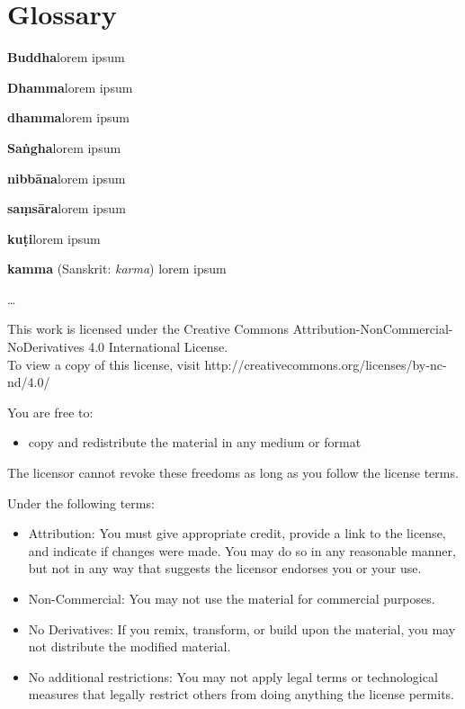 \chapter*{Glossary}
\parindent 0pt
\parskip 4pt

\textbf{Buddha}\hspace{9pt}lorem ipsum

\textbf{Dhamma}\hspace{9pt}lorem ipsum

\textbf{dhamma}\hspace{9pt}lorem ipsum

\textbf{Saṅgha}\hspace{9pt}lorem ipsum

\textbf{nibbāna}\hspace{9pt}lorem ipsum

\textbf{saṃsāra}\hspace{9pt}lorem ipsum

\textbf{kuṭi}\hspace{9pt}lorem ipsum

\textbf{kamma}\hspace{9pt} (Sanskrit: \emph{karma}) lorem ipsum

\ldots{}

\clearpage
\mbox{}
\clearpage
\footnotesize
\begin{center}
This work is licensed under the Creative Commons
Attribution-NonCommercial-NoDerivatives 4.0 International License.\\To
view a copy of this license, visit
http://creativecommons.org/licenses/by-nc-nd/4.0/
\end{center}

You are free to:

\begin{itemize}
\item copy and redistribute the material in any medium or format 
\end{itemize}


The licensor cannot revoke these freedoms as long as you follow the
license terms.

Under the following terms:

\begin{itemize}
\item Attribution: You must give appropriate credit, provide a link to 
the
license, and indicate if changes were made. You may do so in any
reasonable manner, but not in any way that suggests the licensor
endorses you or your use. 

\item Non-Commercial: You may not use the material for commercial 
purposes.

\item No Derivatives: If you remix, transform, or build upon the
material, you may not distribute the modified material.

\item No additional restrictions: You may not apply legal terms or
technological measures that legally restrict others from doing anything
the license permits.
\end{itemize}


